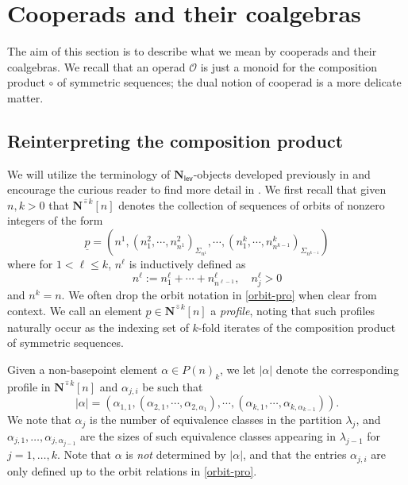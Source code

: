 \documentclass[12pt]{amsart}
\theoremstyle{definition}
\theoremstyle{remark}
\newcommand{\Cal}[1]{\mathcal{#1}}
\newcommand{\Ncirc}[1]{\mathbf{N}^{\hat{\circ}#1}}
\newcommand{\Nl}{\mathbf{N}_{\mathsf{lev}}}
\begin{document}
\section{Cooperads and their coalgebras}

The aim of this section is to describe what we mean by cooperads and their coalgebras. We recall that an operad $\Cal{O}$ is just a monoid for the composition product $\circ$ of symmetric sequences; the dual notion of cooperad is a more delicate matter.

\subsection{Reinterpreting the composition product}
We will utilize the terminology of $\Nl$-objects developed previously in \cite{Clark-1} and encourage the curious reader to find more detail in \cite[Section 6]{Clark-1}. We first recall that given $n,k>0$ that $\Ncirc{k}[n]$ denotes the collection of sequences of orbits of nonzero integers of the form \begin{equation} \label{orbit-pro} \underline{p}=\left( n^1, (n^2_1,\cdots, n^2_{n^1})_{\Sigma_{n^1}}, \cdots, (n^k_1, \cdots, n^{k}_{n^{k-1}})_{\Sigma_{n^{k-1}}} \right)\end{equation}
where for $1<\ell \leq k$, $n^{\ell}$ is inductively defined as \[n^{\ell} := n^{\ell}_1+\cdots+n^{\ell}_{n^{\ell-1}}, \quad n^{\ell}_j > 0\] and $n^k=n$. We often drop the orbit notation in \eqref{orbit-pro} when clear from context. We call an element $\underline{p}\in \Ncirc{k}[n]$ a \textit{profile}, noting that such profiles naturally occur as the indexing set of $k$-fold iterates of the composition product of symmetric sequences. 

Given a non-basepoint element $\alpha\in P(n)_k$, we let $|\alpha|$ denote the corresponding profile in $\Ncirc{k}[n]$ and $\alpha_{j,i}$ be such that \[|\alpha|=\left(\alpha_{1,1}, (\alpha_{2,1},\cdots,\alpha_{2,\alpha_1}), \cdots, (\alpha_{k,1},\cdots,\alpha_{k,\alpha_{k-1}} ) \right).\]
We note that $\alpha_j$ is the number of equivalence classes in the partition $\lambda_j$, and $\alpha_{j,1},\dots, \alpha_{j,\alpha_{j-1}}$ are the sizes of such equivalence classes appearing in $\lambda_{j-1}$ for $j=1,\dots,k$. Note that $\alpha$ is \textit{not} determined by $|\alpha|$, and that the entries $\alpha_{j,i}$ are only defined up to the orbit relations in \eqref{orbit-pro}. 
\end{document}
